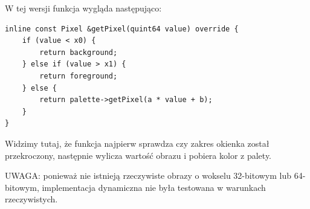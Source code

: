 \par
W tej wersji funkcja  wygląda następująco:
\par
\begin{lstlisting}
inline const Pixel &getPixel(quint64 value) override {
    if (value < x0) {
        return background;
    } else if (value > x1) {
        return foreground;
    } else {
        return palette->getPixel(a * value + b);
    }
}
\end{lstlisting}
\par
Widzimy tutaj, że funkcja najpierw sprawdza czy zakres okienka został przekroczony, następnie wylicza wartość obrazu i pobiera kolor z palety.
\par
UWAGA: ponieważ nie istnieją rzeczywiste obrazy o wokselu 32-bitowym lub 64-bitowym, implementacja dynamiczna nie była testowana w warunkach rzeczywistych.

